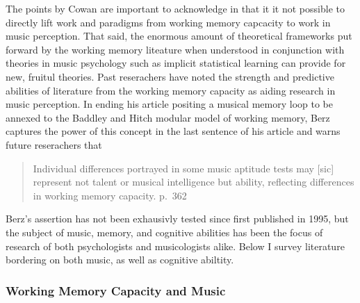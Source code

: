 \documentclass[]{book}
\theoremstyle{definition}
\theoremstyle{definition}
\theoremstyle{definition}
\theoremstyle{remark}
\begin{document}
The points by Cowan are important to acknowledge in that it it not
possible to directly lift work and paradigms from working memory
capcacity to work in music perception. That said, the enormous amount of
theoretical frameworks put forward by the working memory liteature when
understood in conjunction with theories in music psychology such as
implicit statistical learning \citep{saffranStatisticalLearningTone1999}
can provide for new, fruitul theories. Past reserachers have noted the
strength and predictive abilities of literature from the working memory
capacity as aiding research in music perception. In ending his article
positing a musical memory loop to be annexed to the Baddley and Hitch
modular model of working memory, Berz \citep{berzWorkingMemoryMusic1995}
captures the power of this concept in the last sentence of his article
and warns future reserachers that

\begin{quote}
Individual differences portrayed in some music aptitude tests may
{[}sic{]} represent not talent or musical intelligence but ability,
reflecting differences in working memory capacity. p.~362
\end{quote}

Berz's assertion has not been exhausivly tested since first published in
1995, but the subject of music, memory, and cognitive abilities has been
the focus of research of both psychologists and musicologists alike.
Below I survey literature bordering on both music, as well as cognitive
abiltity.

\hypertarget{working-memory-capacity-and-music}{%
\subsubsection{Working Memory Capacity and
Music}\label{working-memory-capacity-and-music}}
\end{document}
